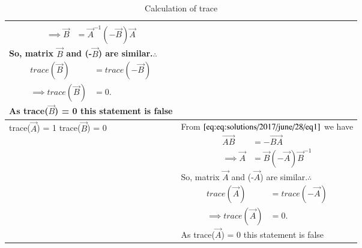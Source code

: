 \begin{table*}[ht!]
\begin{center}
\begin{tabular}{|m{2.2cm}|m{6.3cm}|}
{\begin{align*}
            \implies\vec{B} &= \vec{A}^{-1}(-\vec{B})\vec{A}
        \end{align*}}So, matrix $\vec{B}$ and (-$\vec{B}$) are similar.$\therefore$ {\begin{align*}
            trace(\vec{B}) &= trace(-\vec{B})\\
            \implies trace(\vec{B}) &= 0.
            \end{align*}} As trace($\vec{B}$) = 0 this statement is false\\
        \hline
        trace($\vec{A}$) = 1 trace($\vec{B}$) = 0 & From $\eqref{eq:eq:solutions/2017/june/28/eq1}$ we have {\begin{align*}
            \vec{AB} &= -\vec{BA}\\
            \implies\vec{A} &= \vec{B}(-\vec{A})\vec{B}^{-1}
        \end{align*}}So, matrix $\vec{A}$ and (-$\vec{A}$) are similar.$\therefore$ {\begin{align*}
            trace(\vec{A}) &= trace(-\vec{A})\\
            \implies trace(\vec{A}) &= 0.
            \end{align*}} As trace($\vec{A}$) = 0 this statement is false\\
        \hline
        
    \end{tabular}
    \end{center}
    \caption{Calculation of trace}
    \label{eq:solutions/2017/june/28/tab:my_label1}
\end{table*}
